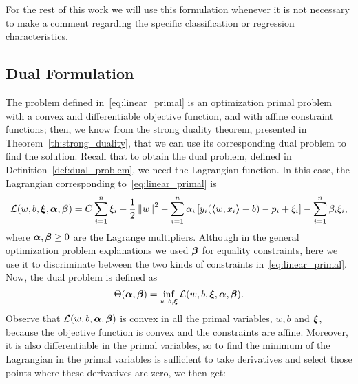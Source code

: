 %
For the rest of this work we will use this formulation whenever it is not necessary to make a comment regarding the specific classification or regression characteristics.

\subsection{Dual Formulation}
%
The problem defined in~\eqref{eq:linear_primal} is an optimization primal problem with a convex and differentiable objective function, and with affine constraint functions; then, we know from the strong duality theorem, presented in Theorem~\ref{th:strong_duality}, that we can use its corresponding dual problem to find the solution. Recall that to obtain the dual problem, defined in Definition~\ref{def:dual_problem}, we need the Lagrangian function. In this case, the Lagrangian corresponding to~\eqref{eq:linear_primal} is 
\begin{equation}
    \label{eq:linear_lagr}
    \lagr(w, b, \fv{\xi}, \fv{\alpha}, \fv{\beta}) = C \sum_{i=1}^\nsamples \xi_i + \frac{1}{2} \norm{w}^2 - \sum_{i=1}^\nsamples \alpha_i \left[ y_i (\dotp{w}{x_i} + b) - p_i + \xi_i \right] - \sum_{i=1}^\nsamples \beta_i \xi_i ,
\end{equation}
%
where $\bm{\alpha}, \bm{\beta} \geq 0$ are the Lagrange multipliers. Although in the general optimization problem explanations we used $\bm{\beta}$ for equality constraints, here we use it to discriminate between the two kinds of constraints in~\eqref{eq:linear_primal}. 
%
Now, the dual problem is defined as 
$$ \Theta(\bm{\alpha}, \bm{\beta}) = \inf_{w, b, \bm{\xi}} \mathcal{L}(w, b, \bm{\xi}, \bm{\alpha}, \bm{\beta}) . $$
Observe that $\mathcal{L}(w, b, \bm{\alpha}, \bm{\beta})$ is convex in all the primal variables, $w, b$ and $\bm{\xi}$, because the objective function is convex and the constraints are affine. Moreover, it is also differentiable in the primal variables, so to find the minimum of the Lagrangian in the primal variables is sufficient to take derivatives and select those points where these derivatives are zero, we then get:
